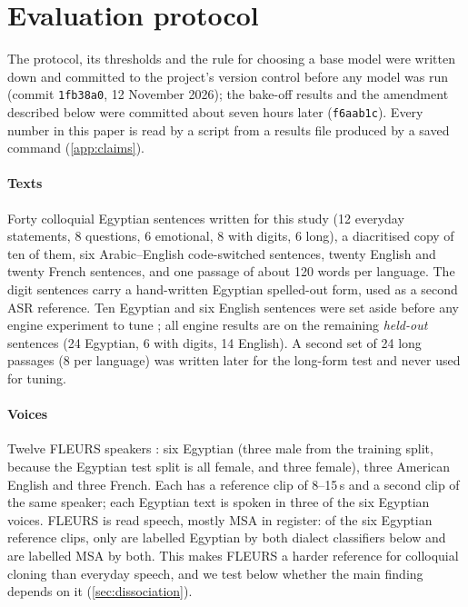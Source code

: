\section{Evaluation protocol}\label{sec:protocol}

The protocol, its thresholds and the rule for choosing a base model were written down and committed to the
project's version control before any model was run (commit \texttt{1fb38a0}, 12 November 2026); the bake-off results
and the amendment described below were committed about seven hours later (\texttt{f6aab1c}). Every number in this paper is read by a script from a results file produced by a saved command
(\cref{app:claims}).

\paragraph{Texts}
Forty colloquial Egyptian sentences written for this study (12 everyday statements, 8 questions, 6 emotional, 8 with
digits, 6 long), a diacritised copy of ten of them, six Arabic--English code-switched sentences, twenty English and
twenty French sentences, and one passage of about 120 words per language. The digit sentences carry a hand-written
Egyptian spelled-out form, used as a second ASR reference. Ten Egyptian and six English sentences were set aside
before any engine experiment to tune \BA; all engine results are on the remaining \emph{held-out} sentences
(24 Egyptian, 6 with digits, 14 English). A second set of 24 long passages (8 per language) was written later for
the long-form test and never used for tuning.

\paragraph{Voices}
Twelve FLEURS speakers \citep{conneau2023fleurs}: six Egyptian (three male from the training split, because the
Egyptian test split is all female, and three female), three American English and three French. Each has a
reference clip of 8--15\,s and a second clip of the same speaker; each Egyptian text is spoken in three of the six
Egyptian voices. FLEURS is read speech, mostly MSA in register: of the six Egyptian reference clips, only
 are labelled Egyptian by both dialect classifiers below and  are labelled MSA by
both. This makes FLEURS a harder reference for colloquial cloning than everyday speech, and we test below whether the
main finding depends on it (\cref{sec:dissociation}).

